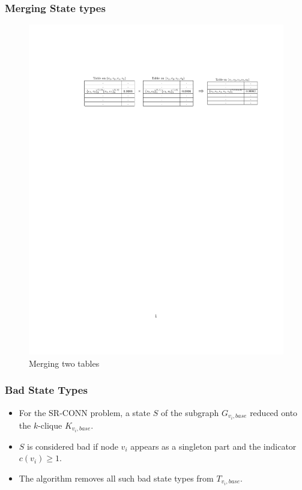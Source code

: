 \documentclass{beamer}
\newcommand{\SRCONN}   { {\mathrm {SR\mbox{-}CONN}} }
\begin{document}
\begin{frame}
\frametitle{Merging State types}
\begin{figure}
\includegraphics[scale=0.8]{partition1.pdf}
\caption{Merging two tables}
\end{figure}
\end{frame}
\begin{frame}
\frametitle{Bad State Types}
\begin{itemize}

\item For the $\SRCONN$ problem, a state $S$ of the subgraph $G_{v_i,base}$ reduced onto the $k$-clique $K_{v_i,base}$.
\item $S$ is considered bad if node $v_i$ appears as a singleton part and the indicator $c({v_i})\geq 1$.
\item The algorithm removes all such bad state types from $T_{v_i,base}$.

\end{itemize}
\end{frame}
\end{document}
